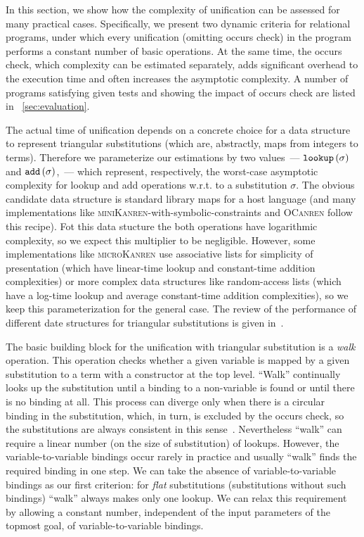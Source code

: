 In this section, we show how the complexity of unification can be assessed for many practical cases. Specifically, we present two dynamic criteria
for relational programs, under which every unification (omitting occurs check) in the program performs a constant number of basic operations. At the same
time, the occurs check, which complexity can be estimated separately, adds significant overhead to the execution time and often increases the asymptotic complexity.
A number of programs satisfying given tests and showing the impact of occurs check are listed in \sectionword~\ref{sec:evaluation}.

The actual time of unification depends on a concrete choice for a data structure to represent triangular substitutions (which are, abstractly, maps from integers to terms).
Therefore we parameterize our estimations by two values~--- $\texttt{lookup}\,(\sigma)$ and $\texttt{add}\,(\sigma)$,~--- which represent, respectively, the
worst-case asymptotic complexity for lookup and add operations w.r.t. to a substitution $\sigma$. The obvious candidate data structure is standard library maps
for a host language (and many implementations like \textsc{miniKanren}-with-symbolic-constraints and \textsc{OCanren} follow this recipe). 
Fot this data stucture the both operations have logarithmic complexity,
so we expect this multiplier to be negligible. However, some implementations like \textsc{microKanren} use associative lists for simplicity of presentation (which have linear-time
lookup and constant-time addition complexities) or more complex data structures like random-access lists (which have a log-time lookup and average constant-time addition complexities),
so we keep this parameterization for the general case. The review of the performance of different date structures for triangular substitutions is given in~\cite{SubstDataStructs}.

The basic building block for the unification with triangular substitution is a \emph{walk} operation. This operation checks whether a given variable is mapped by a given substitution to a
term with a constructor at the top level. ``Walk'' continually looks up the substitution until a binding to a non-variable is found or until there is no binding at all. This
process can diverge only when there is a circular binding in the substitution, which, in turn, is excluded by the occurs check, so the substitutions are always consistent
in this sense~\cite{NominalUnificationWithTriangularSubstitutions}. Nevertheless ``walk'' can require a linear number (on the size of substitution) of lookups.
However, the variable-to-variable bindings occur rarely in practice and usually ``walk'' finds the required binding in one step. We can take the absence of variable-to-variable bindings
as our first criterion: for \emph{flat} substitutions (substitutions without such bindings) ``walk'' always makes only one lookup. We can relax this requirement by allowing a
constant number, independent of the input parameters of the topmost goal, of variable-to-variable bindings.

